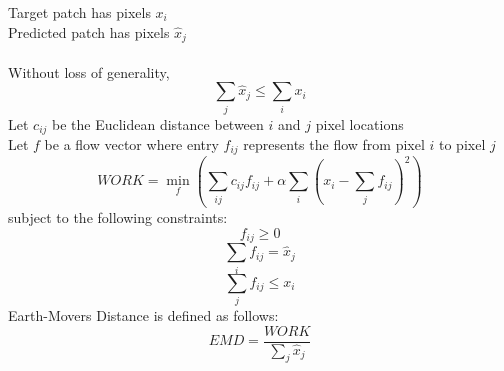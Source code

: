 \documentclass[twoside,11pt]{article}
\theoremstyle{definition}
\begin{document}
Target patch has pixels $x_i$\\
Predicted patch has pixels $\hat{x}_j$\\
\\
Without loss of generality, 
\[
\sum_j{\hat{x}_j} \leq \sum_i{x_i}
\]
Let $c_{ij}$ be the Euclidean distance between $i$ and $j$ pixel locations\\
Let $f$ be a flow vector where entry $f_{ij}$ represents the flow from pixel $i$ to pixel $j$\\
\[
WORK = \min_f(\sum_{ij}{c_{ij} f_{ij}} + \alpha \sum_i{(x_i - \sum_j{f_{ij}})^2})
\]
subject to the following constraints:\\
\[
f_{ij} \geq 0
\]
\[
\sum_i{f_{ij}} = \hat{x}_j
\]
\[
\sum_j{f_{ij}} \leq x_i
\]
Earth-Movers Distance is defined as follows:
\[
EMD = \frac{WORK}{\sum_j{\hat{x}_j}}
\]
\end{document}
